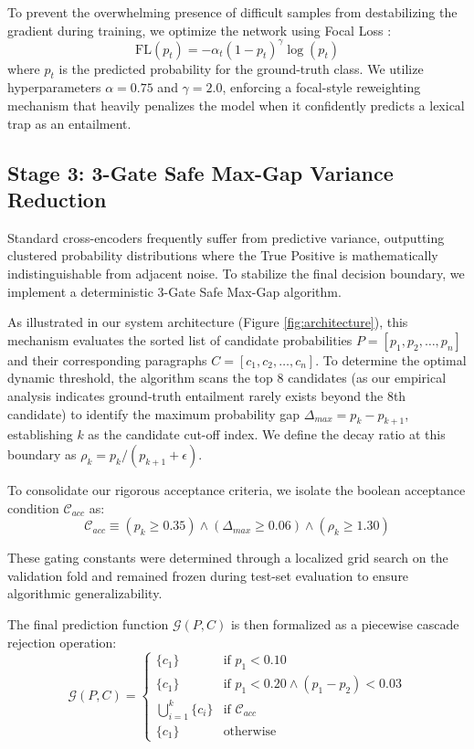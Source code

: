 \documentclass[sigconf]{acmart}
\begin{document}
To prevent the overwhelming presence of difficult samples from destabilizing the gradient during training, we optimize the network using Focal Loss \cite{lin2017focal}:
\begin{equation}
    \mathrm{FL}(p_t) = -\alpha_t (1 - p_t)^\gamma \log(p_t)
\end{equation}
where $p_t$ is the predicted probability for the ground-truth class. We utilize hyperparameters $\alpha=0.75$ and $\gamma=2.0$, enforcing a focal-style reweighting mechanism that heavily penalizes the model when it confidently predicts a lexical trap as an entailment.

\subsection{Stage 3: 3-Gate Safe Max-Gap Variance Reduction}

Standard cross-encoders frequently suffer from predictive variance, outputting clustered probability distributions where the True Positive is mathematically indistinguishable from adjacent noise. To stabilize the final decision boundary, we implement a deterministic 3-Gate Safe Max-Gap algorithm. 

As illustrated in our system architecture (Figure \ref{fig:architecture}), this mechanism evaluates the sorted list of candidate probabilities $P = [p_1, p_2, \dots, p_n]$ and their corresponding paragraphs $C = [c_1, c_2, \dots, c_n]$. To determine the optimal dynamic threshold, the algorithm scans the top 8 candidates (as our empirical analysis indicates ground-truth entailment rarely exists beyond the 8th candidate) to identify the maximum probability gap $\Delta_{max} = p_k - p_{k+1}$, establishing $k$ as the candidate cut-off index. We define the decay ratio at this boundary as $\rho_k = p_k / (p_{k+1} + \epsilon)$. 

To consolidate our rigorous acceptance criteria, we isolate the boolean acceptance condition $\mathcal{C}_{acc}$ as:
\begin{equation}
    \mathcal{C}_{acc} \equiv (p_k \geq 0.35) \land (\Delta_{max} \geq 0.06) \land (\rho_k \geq 1.30)
\end{equation}

These gating constants were determined through a localized grid search on the validation fold and remained frozen during test-set evaluation to ensure algorithmic generalizability.

The final prediction function $\mathcal{G}(P, C)$ is then formalized as a piecewise cascade rejection operation:
\begin{equation}
    \mathcal{G}(P, C) =
    \begin{cases}
        \{c_1\} & \text{if } p_1 < 0.10 \\
        \{c_1\} & \text{if } p_1 < 0.20 \land (p_1 - p_2) < 0.03 \\
        \bigcup_{i=1}^{k} \{c_i\} & \text{if } \mathcal{C}_{acc} \\
        \{c_1\} & \text{otherwise}
    \end{cases}
\end{equation}
\end{document}
